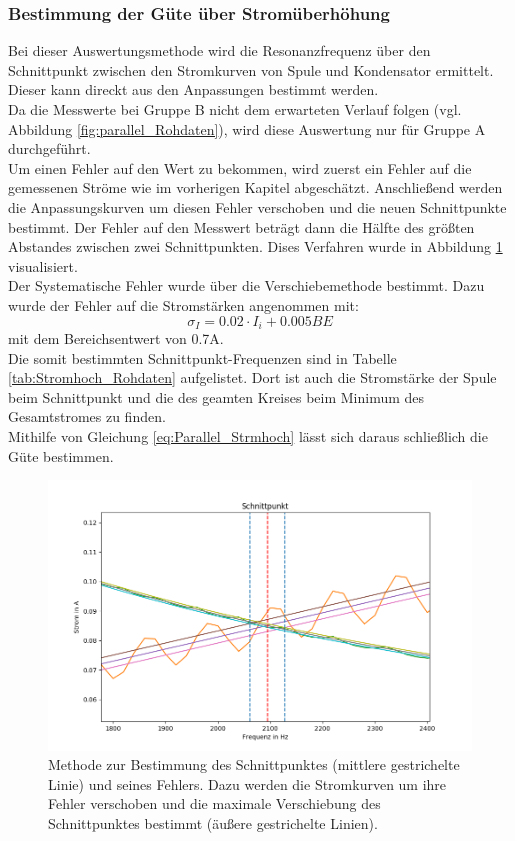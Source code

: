 \documentclass[12pt,a4paper]{article}
\begin{document}
\subsubsection{Bestimmung der Güte über Stromüberhöhung}
Bei dieser Auswertungsmethode wird die Resonanzfrequenz über den Schnittpunkt zwischen den Stromkurven von Spule und Kondensator ermittelt. Dieser kann direckt aus den Anpassungen bestimmt werden.\\
Da die Messwerte bei Gruppe B nicht dem erwarteten Verlauf folgen (vgl. Abbildung \ref{fig:parallel_Rohdaten}), wird diese Auswertung nur für Gruppe A durchgeführt.\\
Um einen Fehler auf den Wert zu bekommen, wird zuerst ein Fehler auf die gemessenen Ströme wie im vorherigen Kapitel abgeschätzt. Anschließend werden die Anpassungskurven um diesen Fehler verschoben und die neuen Schnittpunkte bestimmt. Der Fehler auf den Messwert beträgt dann die Hälfte des größten Abstandes zwischen zwei Schnittpunkten. Dises Verfahren wurde in Abbildung \ref{fig:parallel_Stromhoch} visualisiert.\\
Der Systematische Fehler wurde über die Verschiebemethode bestimmt. Dazu wurde der Fehler auf die Stromstärken angenommen mit:
\begin{equation}
\sigma_I = 0.02\cdot I_i + 0.005BE
\end{equation}
mit dem Bereichsentwert von 0.7A.\\
Die somit bestimmten Schnittpunkt-Frequenzen sind in Tabelle \ref{tab:Stromhoch_Rohdaten} aufgelistet. Dort ist auch die Stromstärke der Spule beim Schnittpunkt und die des geamten Kreises beim Minimum des Gesamtstromes zu finden.\\
Mithilfe von Gleichung \ref{eq:Parallel_Strmhoch} lässt sich daraus schließlich die Güte bestimmen.

\begin{figure}
\centering
\includegraphics[scale=0.6]{Bilder/Parallel_Stromhoch.png}
\caption{Methode zur Bestimmung des Schnittpunktes (mittlere gestrichelte Linie) und seines Fehlers. Dazu werden die Stromkurven um ihre Fehler verschoben und die maximale Verschiebung des Schnittpunktes bestimmt (äußere gestrichelte Linien).}
\label{fig:parallel_Stromhoch}
\end{figure}
\end{document}
